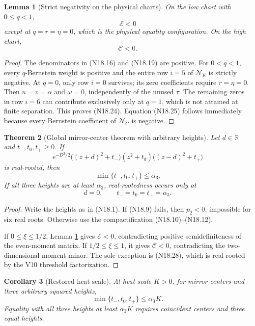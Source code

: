 \documentclass[11pt]{article}
\newtheorem{theorem}{Theorem}[section]
\newtheorem{lemma}[theorem]{Lemma}
\newtheorem{corollary}[theorem]{Corollary}
\theoremstyle{definition}
\theoremstyle{remark}
\begin{document}
\begin{lemma}[Strict negativity on the physical charts]
\label{lem:f2v18-strict}
On the low chart with \(0\leq q<1\),
\[
 \mathcal E<0
 \tag{N18.24}
\]
except at \(q=r=\eta=0\), which is the physical equality configuration.
On the high chart,
\[
 \mathcal C<0.
 \tag{N18.25}
\]
\end{lemma}

\begin{proof}
The denominators in \textup{(N18.16)} and \textup{(N18.19)} are positive.
For \(0<q<1\), every \(q\)-Bernstein weight is positive and the entire
row \(i=5\) of \(\mathcal N_E\) is strictly negative.  At \(q=0\), only
row \(i=0\) survives; its zero coefficients require \(r=\eta=0\).
Then \(u=v=\alpha\) and \(\omega=0\), independently of the unused
\(\tau\).  The remaining zeros in row \(i=6\) can contribute exclusively
only at \(q=1\), which is not attained at finite separation.  This proves
\textup{(N18.24)}.  Equation \textup{(N18.25)} follows immediately because
every Bernstein coefficient of \(\mathcal N_C\) is negative.
\end{proof}

\begin{theorem}[Global mirror-center theorem with arbitrary heights]
\label{thm:f2v18-mirror-all-heights}
Let \(d\in\mathbb R\) and \(t_-,t_0,t_+\geq0\).  If
\[
 e^{-D^2/2}
 \bigl((z+d)^2+t_-\bigr)(z^2+t_0)
 \bigl((z-d)^2+t_+\bigr)
 \tag{N18.26}
\]
is real-rooted, then
\[
 \min\{t_-,t_0,t_+\}\leq\alpha_3.
 \tag{N18.27}
\]
If all three heights are at least \(\alpha_3\), real-rootedness occurs
only at
\[
 d=0,\qquad t_-=t_0=t_+=\alpha_3.
 \tag{N18.28}
\]
\end{theorem}

\begin{proof}
Write the heights as in \textup{(N18.1)}.  If
\textup{(N18.9)} fails, then \(p_2<0\), impossible for six real roots.
Otherwise use the compactification
\textup{(N18.10)}--\textup{(N18.12)}.

If \(0\leq\xi\leq1/2\), Lemma
\ref{lem:f2v18-strict} gives \(\mathcal E<0\), contradicting positive
semidefiniteness of the even-moment matrix.  If
\(1/2\leq\xi\leq1\), it gives \(\mathcal C<0\), contradicting the
two-dimensional moment minor.  The sole exception is
\textup{(N18.28)}, which is real-rooted by the V10 threshold
factorization.
\end{proof}

\begin{corollary}[Restored heat scale]
\label{cor:f2v18-scale}
At heat scale \(K>0\), for mirror centers and three arbitrary squared
heights,
\[
 \min\{t_-,t_0,t_+\}\leq\alpha_3K.
 \tag{N18.29}
\]
Equality with all three heights at least \(\alpha_3K\) requires coincident
centers and three equal heights.
\end{corollary}
\end{document}
